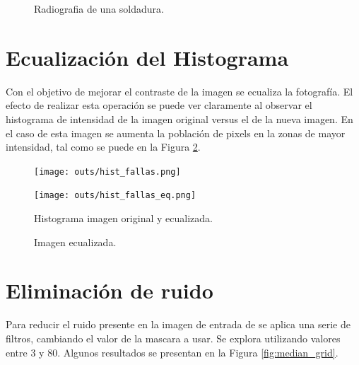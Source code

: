 \documentclass[
  letterpaper,
  twocolumn,
  9pt,
  journal,
  final]{IEEEtran}
\begin{document}
\begin{figure}[!tbh]
  \begin{center}
  \end{center}
  \caption{Radiografia de una soldadura.} \label{fig:original}
\end{figure}


\section{Ecualización del Histograma}\label{ecualizacion}

Con el objetivo de mejorar el contraste de la imagen se ecualiza la fotografía. El efecto de realizar esta operación se puede ver claramente al observar el histograma de intensidad de la imagen original versus el de la nueva imagen. En el caso de esta imagen se aumenta la población de pixels en la zonas de mayor intensidad, tal como se puede en la Figura \ref{fig:hist_eq}.

\begin{figure}[!tbh]
  \centering
  \begin{minipage}[b]{0.49\columnwidth}
    \texttt{[image: outs/hist\_fallas.png]}
  \end{minipage}
  \begin{minipage}[b]{0.49\columnwidth}
    \texttt{[image: outs/hist\_fallas\_eq.png]}
  \end{minipage}
  \caption{Histograma imagen original y ecualizada.} \label{fig:hist_eq}
\end{figure}

\begin{figure}[tbh!]
  \begin{center}
  \end{center}
  \caption{Imagen ecualizada.} \label{fig:original_eq}
\end{figure}

\section{Eliminación de ruido}\label{ruido}

Para reducir el ruido presente en la imagen de entrada de se aplica una serie de filtros, cambiando el valor de la mascara a usar. Se explora utilizando valores entre 3 y 80. Algunos resultados se presentan en la Figura \ref{fig:median_grid}.
\end{document}
